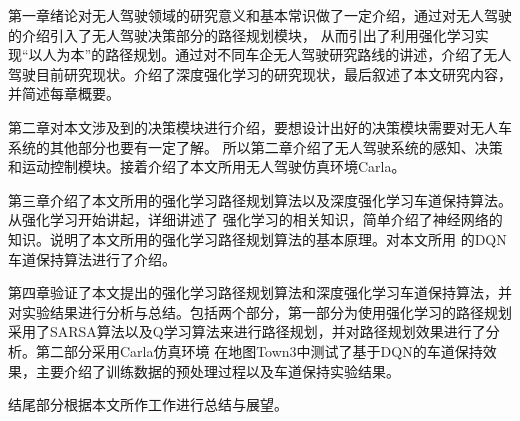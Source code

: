 第一章绪论对无人驾驶领域的研究意义和基本常识做了一定介绍，通过对无人驾驶的介绍引入了无人驾驶决策部分的路径规划模块，
从而引出了利用强化学习实现“以人为本”的路径规划。通过对不同车企无人驾驶研究路线的讲述，介绍了无人驾驶目前研究现状。介绍了深度强化学习的研究现状，最后叙述了本文研究内容，并简述每章概要。

第二章对本文涉及到的决策模块进行介绍，要想设计出好的决策模块需要对无人车系统的其他部分也要有一定了解。
所以第二章介绍了无人驾驶系统的感知、决策和运动控制模块。接着介绍了本文所用无人驾驶仿真环境Carla。

第三章介绍了本文所用的强化学习路径规划算法以及深度强化学习车道保持算法。从强化学习开始讲起，详细讲述了
强化学习的相关知识，简单介绍了神经网络的知识。说明了本文所用的强化学习路径规划算法的基本原理。对本文所用
的DQN车道保持算法进行了介绍。

第四章验证了本文提出的强化学习路径规划算法和深度强化学习车道保持算法，并对实验结果进行分析与总结。包括两个部分，第一部分为使用强化学习的路径规划
采用了SARSA算法以及Q学习算法来进行路径规划，并对路径规划效果进行了分析。第二部分采用Carla仿真环境
在地图Town3中测试了基于DQN的车道保持效果，主要介绍了训练数据的预处理过程以及车道保持实验结果。

结尾部分根据本文所作工作进行总结与展望。








